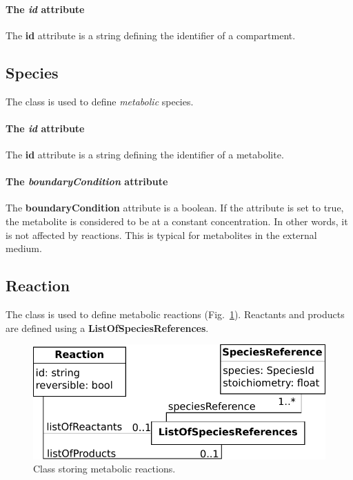 \paragraph{The \textit{id} attribute}
The \textbf{id} attribute is a string defining the identifier of a compartment.


\subsection{Species}
\label{sec:species}

The \species{} class is used to define \emph{metabolic} species.

\paragraph{The \textit{id} attribute}
The \textbf{id} attribute is a string defining the identifier of a metabolite.

\paragraph{The \textit{boundaryCondition} attribute}
The \textbf{boundaryCondition} attribute is a boolean.
If the attribute is set to true, the metabolite is considered to be at
a constant concentration.
In other words, it is not affected by reactions.
This is typical for metabolites in the external medium.


\subsection{Reaction}
\label{sec:reaction}

The \reaction{} class is used to define metabolic reactions
(Fig.~\ref{fig:metabolism_reaction}).
Reactants and products are defined using a \textbf{ListOfSpeciesReferences}.

\begin{figure}
  \centering
  \includegraphics[scale=0.8]{figures/metabolism_reaction}
  \caption{Class storing metabolic reactions.}
\label{fig:metabolism_reaction}
\end{figure}

